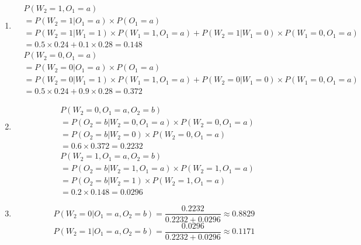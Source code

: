 \begin{exercise}[HMM]
\begin{solution}
\begin{enumerate}
    \item 
    \begin{equation}
      \begin{aligned}
        &  P(W_2 = 1 , O_1 = a) \\
        &= P(W_2 = 1 | O_1 = a) \times P(O_1 = a) \\
        &= P(W_2 = 1 | W_1 = 1) \times P(W_1 = 1, O_1 = a) + P(W_2 = 1 | W_1 = 0) \times P(W_1 = 0, O_1 = a) \\
        &= 0.5 \times 0.24 +  0.1 \times 0.28 = 0.148
      \end{aligned}
    \end{equation}
    \begin{equation}
      \begin{aligned}
        &  P(W_2 = 0 , O_1 = a) \\
        &= P(W_2 = 0 | O_1 = a) \times P(O_1 = a) \\
        &= P(W_2 = 0 | W_1 = 1) \times P(W_1 = 1, O_1 = a) + P(W_2 = 0 | W_1 = 0) \times P(W_1 = 0, O_1 = a) \\
        &= 0.5 \times 0.24 +  0.9 \times 0.28 = 0.372
      \end{aligned}
    \end{equation}

    \item \begin{equation}
      \begin{aligned}
        & P(W_2 = 0, O_1 = a, O_2 = b) \\
        &=P(O_2 = b | W_2 = 0, O_1 = a) \times P(W_2 = 0 , O_1 = a)  \\
        &=P(O_2 = b | W_2 = 0) \times P(W_2 = 0 , O_1 = a) \\
        &=0.6 \times 0.372 = 0.2232
      \end{aligned}
    \end{equation}
      \begin{equation}
      \begin{aligned}
        & P(W_2 = 1, O_1 = a, O_2 = b) \\
        &=P(O_2 = b | W_2 = 1, O_1 = a) \times P(W_2 = 1 , O_1 = a)  \\
        &=P(O_2 = b | W_2 = 1) \times P(W_2 = 1 , O_1 = a) \\
        &=0.2 \times 0.148 = 0.0296
      \end{aligned}
    \end{equation}

    \item \begin{equation} P(W_2 = 0 | O_1 = a, O_2 = b) = \frac{0.2232}{0.2232+0.0296} \approx 0.8829
    \end{equation}
    \begin{equation} P(W_2 = 1 | O_1 = a, O_2 = b) = \frac{0.0296}{0.2232+0.0296} \approx 0.1171
    \end{equation}
    
  \end{enumerate}
  \end{solution}
  \label{ex3}
\end{exercise}